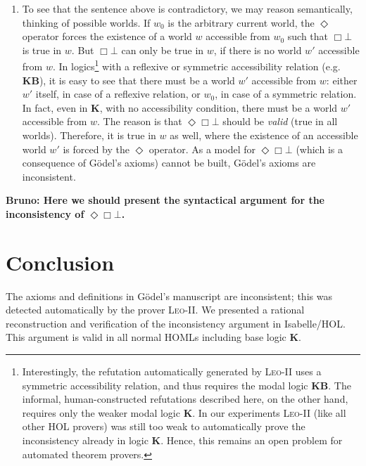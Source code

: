 \documentclass{llncs}
\newcommand{\logic}[1]{\textbf{#1}\xspace}
\newcommand{\KB}{\logic{KB}}
\newcommand{\K}{\logic{K}}
\newcommand{\Dia}{\Diamond} %
\newcommand{\nec}{\Box}
\newcommand{\pos}{\Dia}
\begin{document}
\begin{enumerate}
\item To see that the sentence above is contradictory, we may reason semantically, thinking of possible worlds. If $w_0$ is the arbitrary current world, the $\pos$ operator forces the existence of a world $w$ accessible from $w_0$ such that $\nec \bot$ is true in $w$. But $\nec \bot$ can only be true in $w$, if there is no world $w'$ accessible from $w$. In logics\footnote{
  Interestingly, the refutation automatically generated by
  \textsc{Leo-II} uses a symmetric accessibility relation, and thus
  requires the modal logic \KB. The informal, human-constructed
  refutations described here, on the other hand, requires only the
  weaker modal logic \K. In our experiments \textsc{Leo-II} (like all
  other HOL provers) was still too weak to automatically prove the
  inconsistency already in logic \K. Hence, this remains an open problem for automated
  theorem provers.
} with a reflexive or symmetric accessibility relation (e.g. \KB), it is easy to see that there must be a world $w'$ accessible from $w$: either $w'$ itself, in case of a reflexive relation, or $w_0$, in case of a symmetric relation. In fact, even in \K, with no accessibility condition, there must be a world $w'$ accessible from $w$. The reason is that $\pos \nec \bot$ should be \emph{valid} (true in all worlds). Therefore, it is true in $w$ as well, where the existence of an accessible world $w'$ is forced by the $\pos$ operator. As a model for $\pos \nec \bot$ (which is a consequence of G\"odel's axioms) cannot be built, G\"odel's axioms are inconsistent.
\end{enumerate}




\textbf{Bruno: Here we should present the syntactical argument for the
  inconsistency of $\pos \nec \bot $.}









\section{Conclusion}\label{sec:conclusion}



The axioms and definitions in G\"odel's manuscript are inconsistent;
this was detected automatically by the prover
\textsc{Leo-II}. We presented a rational reconstruction and
verification of the inconsistency argument in Isabelle/HOL. This
argument is valid in all normal HOMLs including base logic \K.
\end{document}
